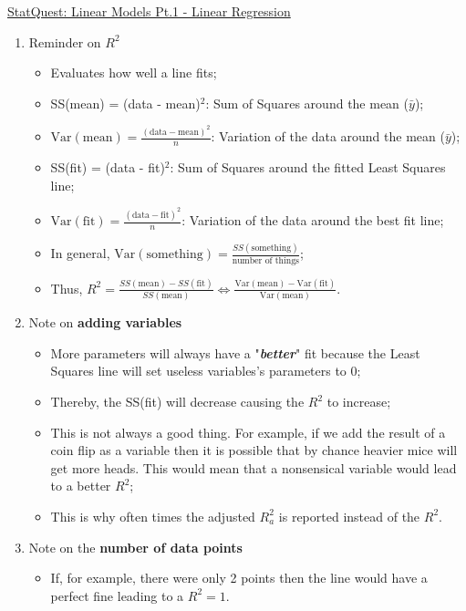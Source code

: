 \documentclass[12pt, titlepage, french]{report}
\begin{document}
\begin{YTB_SUMM}{\href{https://www.youtube.com/watch?v=nk2CQITm_eo&list=PLblh5JKOoLUIzaEkCLIUxQFjPIlapw8nU&index=2}{StatQuest: Linear Models Pt.1 - Linear Regression}}
\begin{enumerate}
	\item	Reminder on $R^{2}$ 
	\begin{itemize}
		\item	Evaluates how well a line fits;
		\item	SS(mean) = (data - mean)$^{2}$: Sum of Squares around the mean ($\bar{y}$);
		\item	$\text{Var}(\text{mean}) = \frac{(\text{data} - \text{mean})^{2}}{n}$: Variation of the data around the mean ($\bar{y}$);
		\item	SS(fit) = (data - fit)$^{2}$: Sum of Squares around the fitted Least Squares line;
		\item	$\text{Var}(\text{fit}) = \frac{(\text{data} - \text{fit})^{2}}{n}$: Variation of the data around the best fit line;
		\item	In general, $\text{Var}(\text{something}) = \frac{SS(\text{something})}{\text{number of things}}$;
		\item	Thus, $R^{2} = \frac{SS(\text{mean}) - SS(\text{fit})}{SS(\text{mean})} \Leftrightarrow \frac{\text{Var}(\text{mean}) - \text{Var}(\text{fit})}{\text{Var}(\text{mean})}$.
	\end{itemize}	
	\item	Note on \textbf{adding variables}
	\begin{itemize}
		\item	More parameters will always have a "\textit{\textbf{better}}" fit because the Least Squares line will set useless variables's parameters to 0;
		\item	Thereby, the SS(fit) will decrease causing the $R^{2}$ to increase;
		\item	This is not always a good thing. For example, if we add the result of a coin flip as a variable then it is possible that by chance heavier mice will get more heads. This would mean that a nonsensical variable would lead to a better $R^{2}$;
		\item	This is why often times the adjusted $R^{2}_{a}$ is reported instead of the $R^{2}$.
	\end{itemize}		
	\item	Note on the \textbf{number of data points}
	\begin{itemize}
		\item	If, for example, there were only 2 points then the line would have a perfect fine leading to a $R^{2} = 1$.

\end{itemize}
\end{enumerate}
\end{YTB_SUMM}
\end{document}
